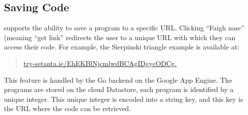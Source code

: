 \subsection{Saving Code}

\trys{} supports the ability to save a program to a specific URL. Clicking ``Faigh nasc'' (meaning ``get link'' redirects the user to a unique URL with which they can access their code. For example, the Sierpinski triangle example is available at:
\begin{quote}
    \href{https://try-setanta.ie/EhEKBlNjcmlwdBCAgIDgycODCg}{try-setanta.ie/EhEKBlNjcmlwdBCAgIDgycODCg.}
\end{quote}

This feature is handled by the Go backend on the Google App Engine. The programs are stored on the cloud Datastore, each program is identified by a unique integer. This unique integer is encoded into a string key, and this key is the URL where the code can be retrieved.
